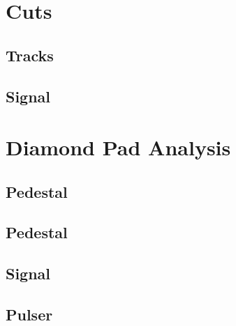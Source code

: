 \documentclass[9pt]{beamer}
\begin{document}
\section{Cuts}
\subsection{Tracks}
\begin{frame}
\end{frame}
\subsection{Signal}
\begin{frame}
\end{frame}
\section{Diamond Pad Analysis}
\subsection{Pedestal}
\begin{frame}
\end{frame}
\subsection{Pedestal}
\begin{frame}
\end{frame}
\subsection{Signal}
\begin{frame}
\end{frame}
\subsection{Pulser}
\begin{frame}
\end{frame}
\end{document}
